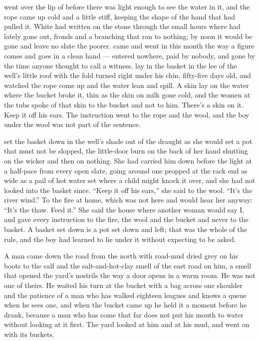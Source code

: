 
 went over the lip of  before there was light enough to see the water in it, and the rope came up cold and a little stiff, keeping the shape of the hand that had pulled it. White had written on the stone through the small hours where  had lately gone out, fronds and a branching that ran to nothing; by noon it would be gone and leave no slate the poorer.  came and went in this month the way a figure comes and goes in a clean hand --- entered nowhere, paid by nobody, and gone by the time anyone thought to call a witness.  lay in the basket in the lee of the well's little roof with the fold turned right under his chin, fifty-five days old, and watched the rope come up and the water lean and spill. A skin lay on the water where the bucket broke it, thin as the skin on milk gone cold, and the women at the tubs spoke of that skin to the bucket and not to him. There's a skin on it. Keep it off his ears. The instruction went to the rope and the wool, and the boy under the wool was not part of the sentence.

 set the basket down in the well's shade out of the draught as she would set a pot that must not be slopped, the little-door burn on the back of her hand shutting on the wicker and then on nothing. She had carried him down before the light at a half-pace from every open slate, going around one propped at the rack end as wide as a pail of hot water set where a child might knock it over, and she had not looked into the basket since. “Keep it off his ears,” she said to the wool. “It's the river wind.” To the fire at home, which was not here and would hear her anyway: “It's the thaw. Feed it.” She said the house where another woman would say I, and gave every instruction to the fire, the wool and the bucket and never to the basket. A basket set down is a pot set down and left; that was the whole of the rule, and the boy had learned to lie under it without expecting to be asked.

A man came down the road from the north with road-mud dried grey on his boots to the calf and the salt-and-hot-clay smell of the east road on him, a smell that opened the yard's nostrils the way a door opens in a warm room. He was not one of theirs. He waited his turn at the bucket with a bag across one shoulder and the patience of a man who has walked eighteen leagues and knows a queue when he sees one, and when the bucket came up he held it a moment before he drank, because a man who has come that far does not put his mouth to water without looking at it first. The yard looked at him and at his mud, and went on with its buckets.

